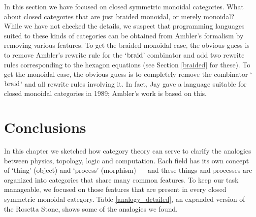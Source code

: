\documentclass[12pt,twoside,openright]{report}
\newcommand{\braid}{{\rm braid}}
\begin{document}
In this section we have focused on closed symmetric monoidal categories.  What about closed categories that are just braided monoidal, or merely monoidal?  While we have not checked the details, we suspect that programming languages suited to these kinds of categories can be obtained from Ambler's formalism by removing various features.  To get the braided monoidal case, the obvious guess is to remove Ambler's rewrite rule for the `$\braid$' combinator and add two rewrite rules corresponding to the hexagon equations (see Section \ref{braided} for these).  To get the monoidal case, the obvious guess is to completely remove the combinator `$\braid$' and all rewrite rules involving it.  In fact, Jay \cite{Jay1989} gave a language suitable for closed monoidal categories in 1989; Ambler's work is based on this.  

\section{Conclusions}
\label{conclusions}

In this chapter we sketched how category theory can serve to clarify the analogies between physics, topology, logic and computation.  Each field has its own concept of `thing' (object) and `process' (morphism) --- and these things and processes are organized into categories that share many common features.  To keep our task manageable, we focused on those features that are present in every closed symmetric monoidal category.  Table \ref{analogy_detailed}, an expanded version of the Rosetta Stone, shows some of the analogies we found.
\end{document}

